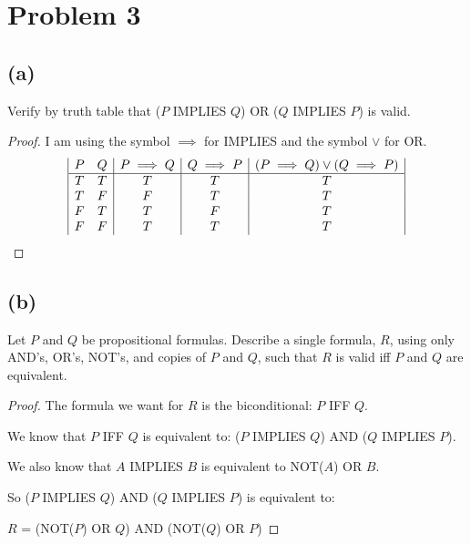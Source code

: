 \documentclass[14pt]{extarticle}
\begin{document}
\section{Problem 3}
\subsection{(a)} 
Verify by truth table that ($P$ IMPLIES $Q$) OR ($Q$ IMPLIES $P$) is valid.
\begin{proof}
I am using the symbol $\implies$ for IMPLIES and the symbol $\vee$ for OR.
$$
\begin{array}{|c c|c|c|c|}
P & Q & P \implies Q & Q \implies P & (P \implies Q) \vee (Q \implies P) \\ 
\hline 
T & T & T & T & T \\
T & F & F & T & T \\
F & T & T & F & T \\
F & F & T & T & T
\end{array}
$$
\end{proof}

\subsection{(b)}
Let $P$ and $Q$ be propositional formulas. Describe a single formula, $R$, using only AND’s, OR’s, NOT’s, and copies of $P$ and $Q$, such that $R$ is valid iff $P$ and $Q$ are equivalent.
\begin{proof}
The formula we want for $R$ is the biconditional: $P$ IFF $Q$.

We know that $P$ IFF $Q$ is equivalent to: ($P$ IMPLIES $Q$) AND ($Q$ IMPLIES $P$).

We also know that $A$ IMPLIES $B$ is equivalent to NOT($A$) OR $B$.

So ($P$ IMPLIES $Q$) AND ($Q$ IMPLIES $P$) is equivalent to:

$R$ = (NOT($P$) OR $Q$) AND (NOT($Q$) OR $P$)
\end{proof}
\end{document}
